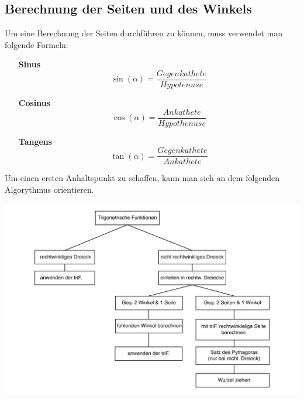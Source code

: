 \subsection{Berechnung der Seiten und des Winkels}\label{sec:Trigonometrie/Berechnung der und des Winkels}
	Um eine Berechnung der Seiten durchführen zu können, muss verwendet man folgende Formeln:
	\begin{flushleft}
\begin{itemize}
	\item [\textbf{Sinus}] \[ \sin(\alpha)=\frac{Gegenkathete}{Hypotenuse} \]
	\item [\textbf{Cosinus}] \[ \cos(\alpha)=\frac{Ankathete}{Hypothenuse} \]
	\item [\textbf{Tangens}] \[ \tan(\alpha)=\frac{Gegenkathete}{Ankathete} \]
\end{itemize}
\end{flushleft}
Um einen ersten Anhaltspunkt zu schaffen, kann man sich an dem folgenden Algorythmus orientieren.
\begin{flushleft}

	\includegraphics[width=15cm]{Media/Algorythmus_Berechnung_eines_Dreiecks}
\end{flushleft}
\pagebreak

